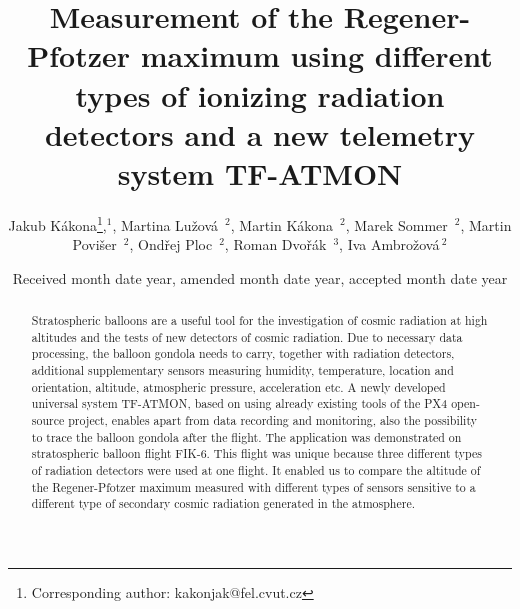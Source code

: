 \documentclass{Rpd}
\begin{document}

\def\copyrightyear{2021}%

\title[TF-ATMON ionizing radiation measurement]{Measurement of the Regener-Pfotzer maximum using different types of ionizing radiation detectors and a new telemetry system TF-ATMON}
\author[Kakona J. \textit{et~al}]{Jakub Kákona\footnote{Corresponding author: kakonjak@fel.cvut.cz},$^{ 1}$,  Martina Lužová \,$^{ 2}$, Martin Kákona \,$^{ 2}$, Marek Sommer \,$^{ 2}$, Martin Povišer \,$^{ 2}$, Ondřej Ploc \,$^{ 2}$, Roman Dvořák \,$^{ 3}$, Iva Ambrožová\,$^{ 2}$}
\address{$^{ 1}$Czech Technical University in Prague, Faculty of Electrical Engineering, Prague, Czech Republic \newline $^{ 2}$Department of Radiation Dosimetry, Nuclear Physics Institute of the CAS, Na Truhlářce 39/64, 180 00, Prague 8, Czech Republic \newline $^{ 3}$ ThunderFly s.r.o., U Jatek 19, Soběslav  392 01, Czech Republic}

\date{Received month date year, amended month date year, accepted month date year} %

\begin{abstract}
Stratospheric balloons are a useful tool for the investigation of cosmic radiation at high altitudes and the tests of new detectors of cosmic radiation. Due to necessary data processing, the balloon gondola needs to carry, together with radiation detectors, additional supplementary sensors measuring humidity, temperature, location and orientation, altitude, atmospheric pressure, acceleration etc. A newly developed universal system TF-ATMON, based on using already existing tools of the PX4 open-source project, enables apart from data recording and monitoring, also the possibility to trace the balloon gondola after the flight. The application was demonstrated on stratospheric balloon flight FIK-6. This flight was unique because three different types of radiation detectors were used at one flight. It enabled us to compare the altitude of the Regener-Pfotzer maximum measured with different types of sensors sensitive to a different type of secondary cosmic radiation generated in the atmosphere.
\end{abstract}

\maketitle
\end{document}
